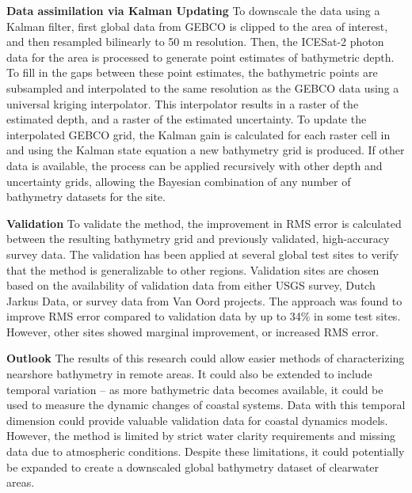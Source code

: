 \noindent\textbf{Data assimilation via Kalman Updating} To downscale the data using a Kalman filter, first global data from GEBCO is clipped to the area of interest, and then resampled bilinearly to 50 m resolution. Then, the ICESat-2 photon data for the area is processed to generate point estimates of bathymetric depth. To fill in the gaps between these point estimates, the bathymetric points are subsampled and interpolated to the same resolution as the GEBCO data using a universal kriging interpolator. This interpolator results in a raster of the estimated depth, and a raster of the estimated uncertainty. To update the interpolated GEBCO grid, the Kalman gain is calculated for each raster cell in and using the Kalman state equation a new bathymetry grid is produced. If other data is available, the process can be applied recursively with other depth and uncertainty grids, allowing the Bayesian combination of any number of bathymetry datasets for the site.


\noindent \textbf{Validation} To validate the method, the improvement in RMS error is calculated between the resulting bathymetry grid and previously validated, high-accuracy survey data. The validation has been applied at several global test sites to verify that the method is generalizable to other regions. Validation sites are chosen based on the availability of validation data from either USGS survey, Dutch Jarkus Data, or survey data from Van Oord projects. The approach was found to improve RMS error compared to validation data by up to 34\% in some test sites. However, other sites showed marginal improvement, or increased RMS error.   


\noindent\textbf{Outlook} The results of this research could allow easier methods of characterizing nearshore bathymetry in remote areas. It could also be extended to include temporal variation – as more bathymetric data becomes available, it could be used to measure the dynamic changes of coastal systems. Data with this temporal dimension could provide valuable validation data for coastal dynamics models. However, the method is limited by strict water clarity requirements and missing data due to atmospheric conditions. Despite these limitations, it could potentially be expanded to create a downscaled global bathymetry dataset of clearwater areas.